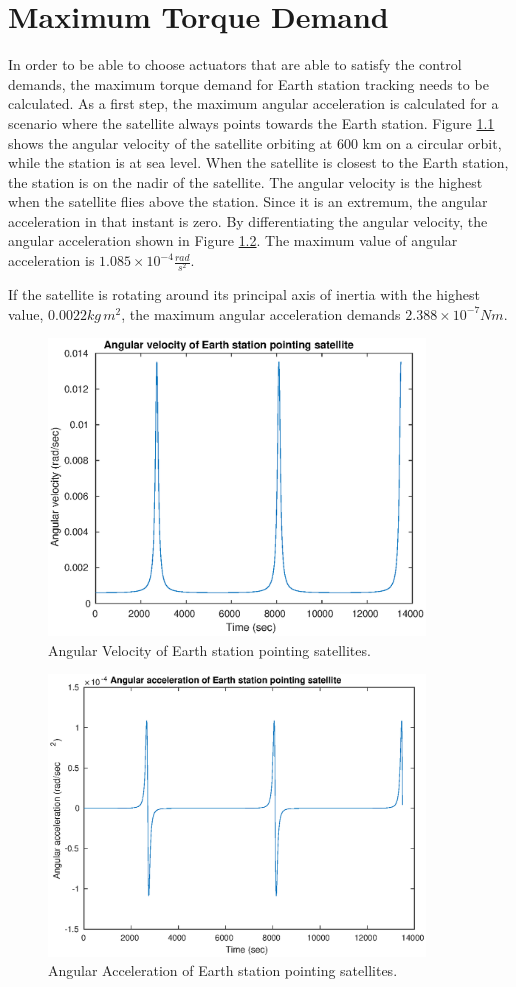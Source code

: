 \chapter{Maximum Torque Demand} \label{chap:D}

In order to be able to choose actuators that are able to satisfy the control demands, the maximum torque demand for Earth station tracking needs to be calculated. As a first step, the maximum angular acceleration is calculated for a scenario where the satellite always points towards the Earth station. Figure \ref{fig:maxOmega} shows the angular velocity of the satellite orbiting at 600 km on a circular orbit, while the station is at sea level. When the satellite is closest to the Earth station, the station is on the nadir of the satellite. The angular velocity is the highest when the satellite flies above the station. Since it is an extremum, the angular acceleration in that instant is zero. By differentiating the angular velocity, the angular acceleration shown in Figure \ref{fig:maxOmegaDot}. The maximum value of angular acceleration is $1.085 \times 10^{-4} \frac{rad}{s^2}$. 

If the satellite is rotating around its principal axis of inertia with the highest value, $0.0022 k\!g \, m^2$, the maximum angular acceleration demands  \boldmath$ 2.388 \times 10^{-7} Nm$.

\begin{figure}[H]
	\centering
	\includegraphics[width=100mm]{figures/maxOmega}
	\caption{Angular Velocity of Earth station pointing satellites.}
	\label{fig:maxOmega}
\end{figure} 

\begin{figure}[H]
	\centering
	\includegraphics[width=100mm]{figures/maxOmegaDot}
	\caption{Angular Acceleration of Earth station pointing satellites.}
	\label{fig:maxOmegaDot}
\end{figure} 